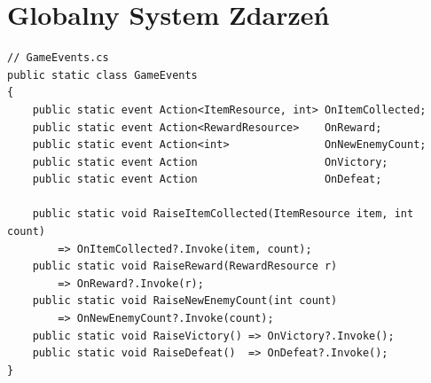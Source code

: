 \section{Globalny System Zdarzeń}

\begin{verbatim}
// GameEvents.cs
public static class GameEvents
{
    public static event Action<ItemResource, int> OnItemCollected;
    public static event Action<RewardResource>    OnReward;
    public static event Action<int>               OnNewEnemyCount;
    public static event Action                    OnVictory;
    public static event Action                    OnDefeat;

    public static void RaiseItemCollected(ItemResource item, int count)
        => OnItemCollected?.Invoke(item, count);
    public static void RaiseReward(RewardResource r)
        => OnReward?.Invoke(r);
    public static void RaiseNewEnemyCount(int count)
        => OnNewEnemyCount?.Invoke(count);
    public static void RaiseVictory() => OnVictory?.Invoke();
    public static void RaiseDefeat()  => OnDefeat?.Invoke();
}
\end{verbatim}

